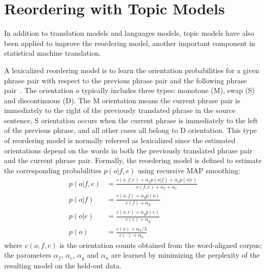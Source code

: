 \section{Reordering with Topic Models}

In addition to translation models and languages models, topic models have also been applied to improve the reordering model, another important component in statistical machine translation.

A lexicalized reordering model is to learn the orientation probabilities for a given phrase pair with respect to the previous phrase pair and the following phrase pair~\citep{Chen-2013}. The orientation $o$ typically includes three types: monotone (M), swap (S) and discontinuous (D). The M orientation means the current phrase pair is immediately to the right of the previously translated phrase in the source sentence, S orientation occurs when the current phrase is immediately to the left of the previous phrase, and all other cases all belong to D orientation. This type of reordering model is normally referred as lexicalized since the estimated orientations depend on the words in both the previously translated phrase pair and the current phrase pair. Formally, the reordering model is defined to estimate the corresponding probabilities $p(o|f,e)$ using recursive MAP smoothing:
\begin{align}
p(o|f,e) &= \frac{c(o,f,e) + \alpha_f p(o|f) + \alpha_e p(o|e)}{c(f,e) + \alpha_f + \alpha_e} \\
p(o|f) &= \frac{c(o,f) + \alpha_g p(o)}{c(f) + \alpha_g} \\
p(o|e) &= \frac{c(o,e) + \alpha_g p(e)}{c(e) + \alpha_g} \\
p(o) &= \frac{c(o) + \alpha_u/3}{c(\cdot) + \alpha_u}
\end{align}
where $c(o,f,e)$ is the orientation counts obtained from the word-aligned corpus;  the parameters $\alpha_f$, $\alpha_e$, $\alpha_g$ and $\alpha_u$ are learned by minimizing the perplexity of the resulting model on the held-out data.

